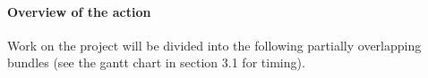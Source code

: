 \documentclass[11pt, a4paper]{article}
\begin{document}














\vspace{-5mm}


\paragraph{Overview of the action}\label{section:packages}\label{overview}
 
Work on the project will be divided into the following partially overlapping bundles (see the gantt chart in section 3.1 for timing). 
\end{document}
